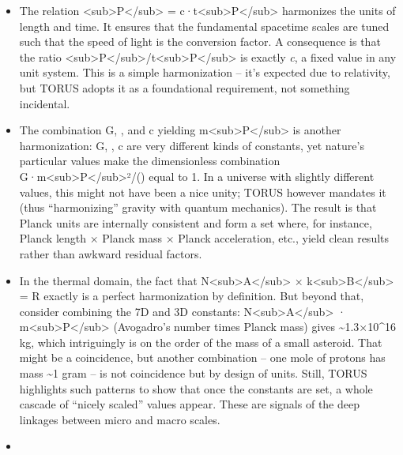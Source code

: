 \documentclass[
]{article}
\begin{document}
\begin{itemize}
\item
  The relation \ell\textless sub\textgreater P\textless/sub\textgreater{} =
  c·t\textless sub\textgreater P\textless/sub\textgreater{} harmonizes
  the units of length and time. It ensures that the fundamental
  spacetime scales are tuned such that the speed of light is the
  conversion factor. A consequence is that the ratio
  \ell\textless sub\textgreater P\textless/sub\textgreater/t\textless sub\textgreater P\textless/sub\textgreater{}
  is exactly \emph{c}, a fixed value in any unit system. This is a
  simple harmonization -- it's expected due to relativity, but TORUS
  adopts it as a foundational requirement, not something incidental.
\item
  The combination G, \hbar, and c yielding
  m\textless sub\textgreater P\textless/sub\textgreater{} is another
  harmonization: G, \hbar, c are very different kinds of constants, yet
  nature's particular values make the dimensionless combination
  G·m\textless sub\textgreater P\textless/sub\textgreater²/(\hbarc) equal to
  1\hspace{0pt}. In a universe with slightly different values, this
  might not have been a nice unity; TORUS however mandates it (thus
  ``harmonizing'' gravity with quantum mechanics). The result is that
  Planck units are internally consistent and form a set where, for
  instance, Planck length × Planck mass × Planck acceleration, etc.,
  yield clean results rather than awkward residual factors.
\item
  In the thermal domain, the fact that
  N\textless sub\textgreater A\textless/sub\textgreater{} ×
  k\textless sub\textgreater B\textless/sub\textgreater{} = R exactly is
  a perfect harmonization by definition. But beyond that, consider
  combining the 7D and 3D constants:
  N\textless sub\textgreater A\textless/sub\textgreater{} ·
  m\textless sub\textgreater P\textless/sub\textgreater{} (Avogadro's
  number times Planck mass) gives \textasciitilde1.3×10\^{}16
  kg\hspace{0pt}, which intriguingly is on the order of the mass of a
  small asteroid. That might be a coincidence, but another combination
  -- one mole of protons has mass \textasciitilde1 gram -- is not
  coincidence but by design of units. Still, TORUS highlights such
  patterns to show that once the constants are set, a whole cascade of
  ``nicely scaled'' values appear. These are signals of the deep
  linkages between micro and macro scales.
\item

\end{itemize}
\end{document}
